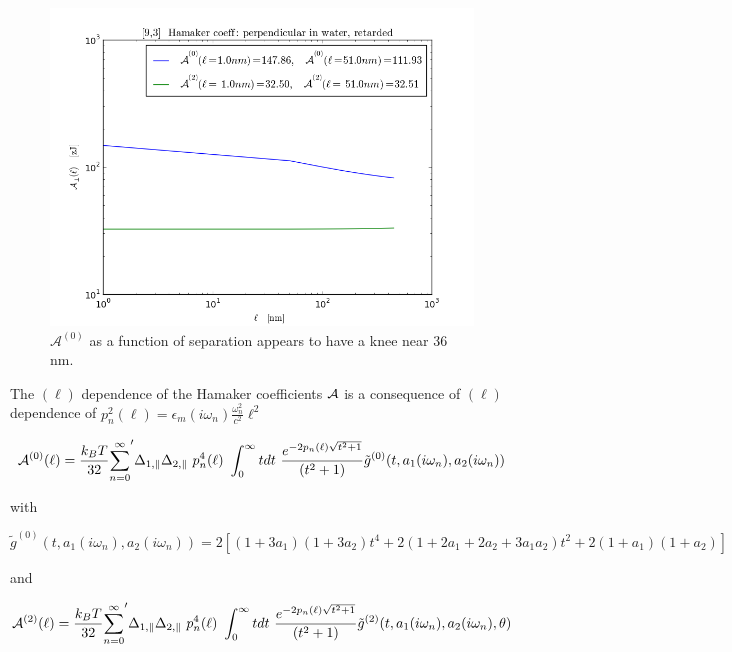\documentclass[a4paper]{article}
\begin{document}
\begin{center}
\begin{figure}[t!]
\begin{center}
    \includegraphics[width=1.2\textwidth]{plots/140322_93w93_HCs_perpendicular_ret.png}
\hskip 43pt
\caption{$\mathcal{A}^{(0)}$ as a function of separation appears to have a knee near 36 nm.}
\label{eiz65}
\end{center}
\end{figure} 

The $(\ell)$ dependence of the Hamaker coefficients $\cal A$ is a consequence of $(\ell)$ dependence of $p_n^{2}(\ell) =  \epsilon_m(i \omega_n) \frac{\omega_n^{2}}{c^{2}} \ell^{2}$

\begin{equation}
{\cal A}^{(0)}(\ell) = \frac{k_BT}{32}  {\sum_{n=0}^{\infty}}' \Delta_{1,\parallel} \Delta_{2,\parallel} ~p_n^{4}(\ell) ~\int_0^{\infty} t dt ~\frac{e^{- 2 p_n(\ell) \sqrt{t^{2} + 1}}}{(t^{2} + 1)} \tilde g^{(0)}(t, a_1(i \omega_n), a_2(i \omega_n))
\end{equation}

with

\begin{equation}
\tilde g^{(0)}(t, a_1(i \omega_n), a_2(i \omega_n)) = 2 \left[ (1+3a_1)(1+3a_2) t^{4} + 2 (1+2a_1+2a_2+3a_1a_2) t^{2}  + 2(1+a_1)(1+a_2)\right]
\end{equation}

and

\begin{equation}
{\cal A}^{(2)}(\ell) = \frac{k_BT}{32}  {\sum_{n=0}^{\infty}}' \Delta_{1,\parallel} \Delta_{2,\parallel} ~p_n^{4}(\ell) ~\int_0^{\infty} t dt ~\frac{e^{- 2 p_n(\ell) \sqrt{t^{2} + 1}}}{(t^{2} + 1)} \tilde g^{(2)}(t, a_1(i \omega_n), a_2(i \omega_n), \theta)
\end{equation}


\end{center}
\end{document}
